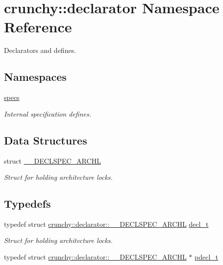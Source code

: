 \hypertarget{namespacecrunchy_1_1declarator}{}\section{crunchy\+:\+:declarator Namespace Reference}
\label{namespacecrunchy_1_1declarator}


Declarators and defines.  


\subsection*{Namespaces}
\begin{DoxyCompactItemize}
\item 
 \hyperlink{namespacecrunchy_1_1declarator_1_1specs}{specs}
\begin{DoxyCompactList}\small\item\em Internal specification defines. \end{DoxyCompactList}\end{DoxyCompactItemize}
\subsection*{Data Structures}
\begin{DoxyCompactItemize}
\item 
struct \hyperlink{structcrunchy_1_1declarator_1_1_____d_e_c_l_s_p_e_c___a_r_c_h_l}{\+\_\+\+\_\+\+D\+E\+C\+L\+S\+P\+E\+C\+\_\+\+A\+R\+C\+H\+L}
\begin{DoxyCompactList}\small\item\em Struct for holding architecture locks. \end{DoxyCompactList}\end{DoxyCompactItemize}
\subsection*{Typedefs}
\begin{DoxyCompactItemize}
\item 
typedef struct \hyperlink{structcrunchy_1_1declarator_1_1_____d_e_c_l_s_p_e_c___a_r_c_h_l}{crunchy\+::declarator\+::\+\_\+\+\_\+\+D\+E\+C\+L\+S\+P\+E\+C\+\_\+\+A\+R\+C\+H\+L} \hyperlink{namespacecrunchy_1_1declarator_a0f9bbabe1552349f0ee0ae228ed30bb2}{decl\+\_\+t}
\begin{DoxyCompactList}\small\item\em Struct for holding architecture locks. \end{DoxyCompactList}\item 
typedef struct \hyperlink{structcrunchy_1_1declarator_1_1_____d_e_c_l_s_p_e_c___a_r_c_h_l}{crunchy\+::declarator\+::\+\_\+\+\_\+\+D\+E\+C\+L\+S\+P\+E\+C\+\_\+\+A\+R\+C\+H\+L} $\ast$ \hyperlink{namespacecrunchy_1_1declarator_a518adbd030268ca7f676cfe5c5ee7624}{pdecl\+\_\+t}
\end{DoxyCompactItemize}
